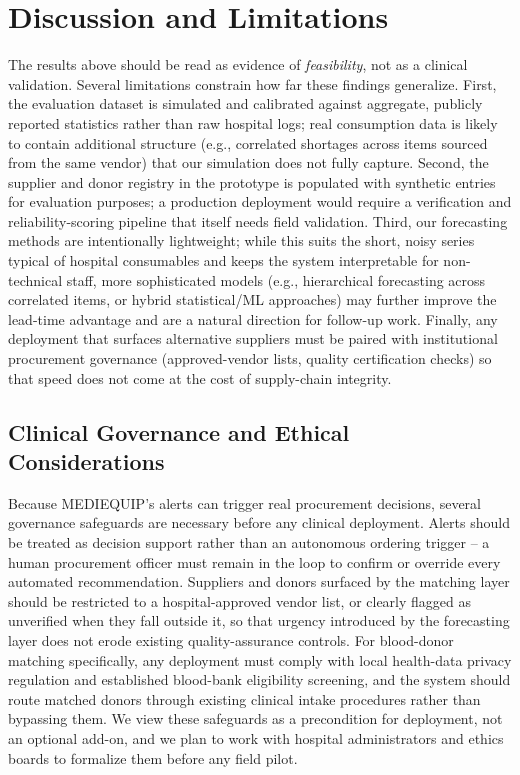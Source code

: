 \documentclass[conference]{IEEEtran}
\begin{document}

\section{Discussion and Limitations}

The results above should be read as evidence of \emph{feasibility}, not as a clinical validation. Several limitations constrain how far these findings generalize. First, the evaluation dataset is simulated and calibrated against aggregate, publicly reported statistics rather than raw hospital logs; real consumption data is likely to contain additional structure (e.g., correlated shortages across items sourced from the same vendor) that our simulation does not fully capture. Second, the supplier and donor registry in the prototype is populated with synthetic entries for evaluation purposes; a production deployment would require a verification and reliability-scoring pipeline that itself needs field validation. Third, our forecasting methods are intentionally lightweight; while this suits the short, noisy series typical of hospital consumables and keeps the system interpretable for non-technical staff, more sophisticated models (e.g., hierarchical forecasting across correlated items, or hybrid statistical/ML approaches) may further improve the lead-time advantage and are a natural direction for follow-up work. Finally, any deployment that surfaces alternative suppliers must be paired with institutional procurement governance (approved-vendor lists, quality certification checks) so that speed does not come at the cost of supply-chain integrity.

\subsection{Clinical Governance and Ethical Considerations}

Because MEDIEQUIP's alerts can trigger real procurement decisions, several governance safeguards are necessary before any clinical deployment. Alerts should be treated as decision support rather than an autonomous ordering trigger -- a human procurement officer must remain in the loop to confirm or override every automated recommendation. Suppliers and donors surfaced by the matching layer should be restricted to a hospital-approved vendor list, or clearly flagged as unverified when they fall outside it, so that urgency introduced by the forecasting layer does not erode existing quality-assurance controls. For blood-donor matching specifically, any deployment must comply with local health-data privacy regulation and established blood-bank eligibility screening, and the system should route matched donors through existing clinical intake procedures rather than bypassing them. We view these safeguards as a precondition for deployment, not an optional add-on, and we plan to work with hospital administrators and ethics boards to formalize them before any field pilot.
\end{document}
